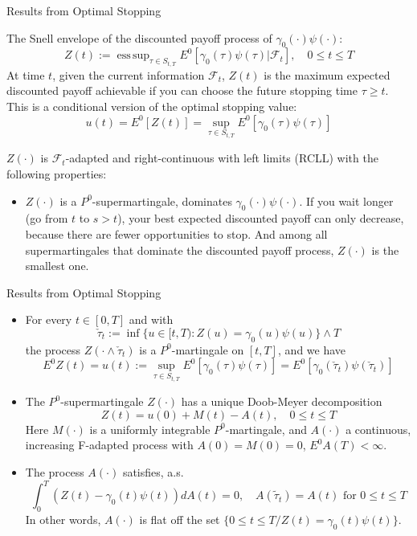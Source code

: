 \documentclass{beamer}
\DeclareMathOperator*{\esssup}{ess\,sup}
\begin{document}
\begin{frame}{Results from Optimal Stopping}

    {\footnotesize \footnotesize
     The Snell envelope of the discounted payoff process of \(\gamma_0(\cdot) \psi(\cdot)\):
    \[
    Z(t) := \esssup_{\tau \in S_{t,T}} E^0 [\gamma_0(\tau) \psi(\tau) | \mathcal{F}_t], \quad 0 \leq t \leq T
    \]
    At time \(t\), given the current information \(\mathcal{F}_t\), \(Z(t)\) is the maximum expected discounted payoff
    achievable if you can choose the future stopping time \(\tau \geq t\). This is a conditional version of the optimal stopping value:
    \[
    u(t) = E^0[Z(t)] = \sup_{\tau \in S_{t,T}} E^0[\gamma_0(\tau)\psi(\tau)] 
    \]

    $Z(\cdot)$ is $\mathcal{F}_t$-adapted and right-continuous with left limits (RCLL) with the following properties:
     \pause \begin{itemize}
        \item \( Z(\cdot) \) is a \(P^0\)-supermartingale, dominates \(\gamma_0(\cdot) \psi(\cdot)\).
        If you wait longer (go from \( t \) to \( s > t \)), your best expected
        discounted payoff can only decrease, because there are fewer opportunities 
        to stop.
        And among all supermartingales that dominate the discounted payoff process,  
    \( Z(\cdot) \) is the smallest one.
        
        
    \end{itemize}
    }
\end{frame} 
\begin{frame}{Results from Optimal Stopping}

    {\footnotesize \footnotesize
    \begin{itemize}
        \item For every \( t \in [0, T] \) and with
        \[
        \check{\tau}_t := \inf\{u \in [t, T) : Z(u) = \gamma_0(u) \psi(u)\} \land T
        \]
        the process \( Z(\cdot \land \check{\tau}_t) \) is a \(P^0\)-martingale on \([t, T]\), and we have
        \[
        E^0Z(t) = u(t) := \sup_{\tau \in S_{t,T}} E^0[\gamma_0(\tau) \psi(\tau)] = 
        E^0 [\gamma_0(\check{\tau}_t) \psi(\check{\tau}_t)]
        \]
        
         \item \pause  The \(P^0\)-supermartingale \( Z(\cdot) \) has a unique Doob-Meyer decomposition
        \[
        Z(t) = u(0) + M(t) - A(t), \quad 0 \leq t \leq T
        \]
        Here \( M(\cdot) \) is a uniformly integrable \(P^0\)-martingale, and \( A(\cdot) \) a continuous,
         increasing F-adapted process with \( A(0) = M(0) = 0 \), 
         \( E^0 A(T) < \infty \).
        
        \item The process \( A(\cdot) \) satisfies, a.s.
        \[
        \int_{0}^{T} (Z(t) - \gamma_0(t) \psi(t)) dA(t) = 0, \quad A(\tilde{\tau}_t) 
        = A(t) \text{ for } 0 \leq t \leq T
        \]
        In other words, \( A(\cdot) \) is flat off the set \(\{0 \leq t \leq T / Z(t) = \gamma_0(t) \psi(t)\}\).
    \end{itemize}
    }
    
\end{frame}
\end{document}
